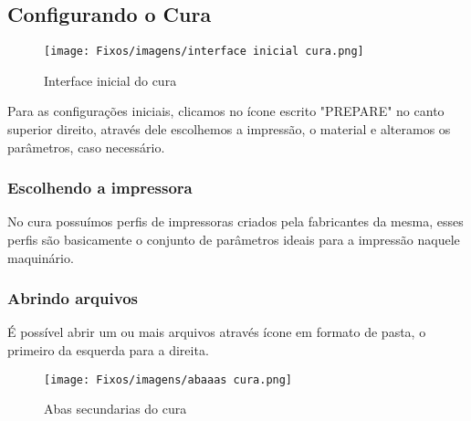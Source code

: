\subsection{Configurando o Cura}



\begin{figure}

    \centering[h!]

    \texttt{[image: Fixos/imagens/interface inicial cura.png]}

    \caption{Interface inicial do cura}

    \label{fig:my_label}

\end{figure}



Para as configurações iniciais, clicamos no ícone escrito  "PREPARE" no canto superior direito, através dele escolhemos a impressão, o material e alteramos os parâmetros, caso necessário. \\[0.2cm]







\subsubsection{Escolhendo a impressora}

No cura possuímos perfis de impressoras criados pela fabricantes da mesma, esses perfis são basicamente o conjunto de parâmetros ideais para a impressão naquele maquinário.\\[0.2cm]



\subsubsection{Abrindo arquivos}

É possível abrir um ou mais arquivos através ícone em formato de pasta, o primeiro da esquerda para a direita.\\[0.2cm]

\begin{figure}[h!]

    \centering

    \texttt{[image: Fixos/imagens/abaaas cura.png]}

    \caption{Abas secundarias do cura}

    \label{fig:my_label}

\end{figure}


